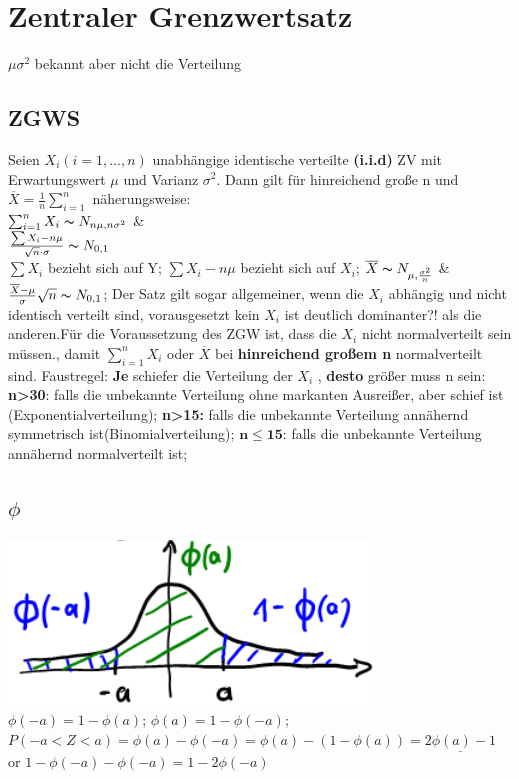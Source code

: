 \section{Zentraler Grenzwertsatz}
$\mu \sigma^2$ bekannt aber nicht die Verteilung
\subsection{ZGWS}
Seien $ X_{i} (i=1, ..., n)$ unabhängige identische verteilte \textbf{(i.i.d)} ZV mit Erwartungswert $\mu$ und Varianz
$ \sigma^2 $. Dann gilt für hinreichend große n  %
und $\overline{X} = \frac{1}{n} \sum_{i=1}^{n}$ näherungsweise:\\
$\sum_{i=1}^{n} X_{i}  \thicksim  N_{n\mu, n\sigma^2}$  \&\\
$\frac{\sum X_{i}-n\mu}{\sqrt{n}\cdot \sigma} \thicksim N_{0,1} $\\
$\sum X_{i} $ bezieht sich auf Y; $\sum X_{i} - n\mu$ bezieht sich auf $ X_{i}$; 
$ \overline{X} \thicksim N_{\mu, \frac{\sigma^2}{n}} $ \& $ \frac{\overline{X}-\mu}{\sigma} \sqrt{n} \thicksim N_{0,1} $; 
Der Satz gilt sogar allgemeiner, wenn die $X_{i}$ abhängig und nicht identisch verteilt sind, vorausgesetzt kein $ X_{i} $ ist deutlich dominanter?! als die anderen.Für die Voraussetzung des  ZGW ist, dass die $ X_{i} $ nicht normalverteilt sein müssen., damit $\sum_{i=1}^{n} X_{i}$ oder $\overline{X}$  bei \textbf{hinreichend großem n} normalverteilt sind. Faustregel: \textbf{Je} schiefer die Verteilung der $ X_{i}$ , \textbf{desto} größer muss n sein: 
\textbf{n>30}: falls die unbekannte Verteilung ohne markanten Ausreißer, aber schief ist (Exponentialverteilung); 
\textbf{n>15:} falls die unbekannte Verteilung annähernd symmetrisch ist(Binomialverteilung); 
$ \boldsymbol{ n \le 15 }$: falls die unbekannte Verteilung annähernd normalverteilt ist; 
\subsection{$\phi$}
\includegraphics[scale=0.25]{./pic/ZGWPhiVerteilung.png} $ \phi(-a ) = 1 - \phi(a) $; $\phi(a) = 1-\phi(-a) $; 
$ P(-a < Z < a) = \phi(a) - \phi(-a) = \phi(a) - (1-\phi(a)) = \underline{ 2\phi(a) -1 } $ or $ 1-\phi(-a) - \phi(-a) = 1 -2\phi(-a)$
